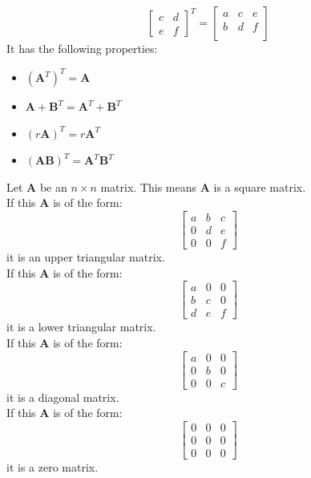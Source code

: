 \documentclass[nobib]{tufte-handout}
\begin{document}
\begin{itemize}
\begin{equation*}
\begin{bmatrix}
                  c & d \\
                  e & f
              \end{bmatrix}^T
              =
              \begin{bmatrix}
                  a & c & e \\
                  b & d & f \\
              \end{bmatrix}
          \end{equation*}
          It has the following properties:
          \begin{itemize}
              \item $(\mathbf{A}^{T})^T = \mathbf{A}$
              \item $\mathbf{A+B}^{T} = \mathbf{A}^T+\mathbf{B}^T$
              \item $(r\mathbf{A})^{T} = r\mathbf{A}^T$
              \item $(\mathbf{AB})^{T} = \mathbf{A}^T\mathbf{B}^T$
          \end{itemize}
\end{itemize}
Let \textbf{A} be an $n\times n$ matrix. This means \textbf{A} is a square matrix.\\
If this \textbf{A} is of the form:
\begin{equation*}
    \begin{bmatrix}
        a & b & c \\
        0 & d & e \\
        0 & 0 & f
    \end{bmatrix}
\end{equation*}
it is an upper triangular matrix.\\
If this \textbf{A} is of the form:
\begin{equation*}
    \begin{bmatrix}
        a & 0 & 0 \\
        b & c & 0 \\
        d & e & f
    \end{bmatrix}
\end{equation*}
it is a lower triangular matrix.\\
If this \textbf{A} is of the form:
\begin{equation*}
    \begin{bmatrix}
        a & 0 & 0 \\
        0 & b & 0 \\
        0 & 0 & c
    \end{bmatrix}
\end{equation*}
it is a diagonal matrix.\\
If this \textbf{A} is of the form:
\begin{equation*}
    \begin{bmatrix}
        0 & 0 & 0 \\
        0 & 0 & 0 \\
        0 & 0 & 0
    \end{bmatrix}
\end{equation*}
it is a zero matrix.\\
\end{document}
